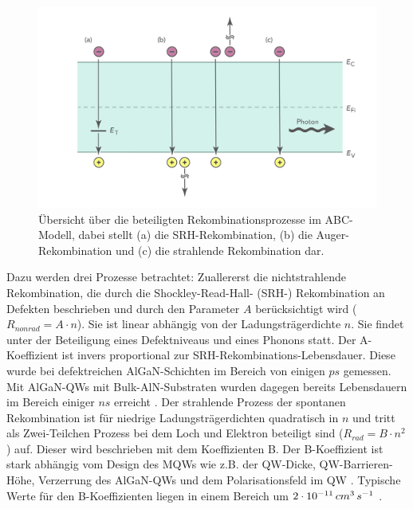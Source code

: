 %
\begin{figure}[h]
    \centering
    \begin{minipage}[t]{0.75\linewidth}
        \centering
        \includegraphics[width=\linewidth]{Bilder/rekbomChannels.png}
        \caption{Übersicht über die beteiligten Rekombinationsprozesse im ABC-Modell, dabei stellt (a) die SRH-Rekombination, (b) die Auger-Rekombination und (c) die strahlende Rekombination dar.}
        \label{fig:rekombChannels}
    \end{minipage}%
\end{figure}
\noindent
%
Dazu werden drei Prozesse betrachtet: Zuallererst die nichtstrahlende Rekombination, die durch die Shockley-Read-Hall- (SRH-) Rekombination an Defekten beschrieben und durch den Parameter $A$ berücksichtigt wird ($R_{nonrad} = A \cdot n $). Sie ist linear abhängig von der Ladungsträgerdichte $n$. Sie findet unter der Beteiligung eines Defektniveaus und eines Phonons statt. Der A-Koeffizient ist invers proportional zur SRH-Rekombinations-Lebensdauer. Diese wurde bei defektreichen AlGaN-Schichten im Bereich von einigen $ps$ gemessen. Mit AlGaN-QWs mit Bulk-AlN-Substraten wurden dagegen bereits Lebensdauern im Bereich einiger $ns$ erreicht \cite{1882-0786-4-9-092101} \cite{doi:10.1002/pssc.201100424}.
\newline
Der strahlende Prozess der spontanen Rekombination ist für niedrige Ladungsträgerdichten quadratisch in $n$ und tritt als Zwei-Teilchen Prozess bei dem Loch und Elektron beteiligt sind ($R_{rad} = B \cdot n^2 $) auf. Dieser wird beschrieben mit dem Koeffizienten B. Der B-Koeffizient ist stark abhängig vom Design des MQWs wie z.B. der QW-Dicke, QW-Barrieren-Höhe, Verzerrung des AlGaN-QWs und dem Polarisationsfeld im QW \cite{kneissl}. Typische Werte für den B-Koeffizienten liegen in einem Bereich um $2 \cdot 10^{-11} \thinspace cm^3 \thinspace s^{-1}$ \cite{1882-0786-8-2-022104} \cite{1882-0786-4-5-052101}.  
